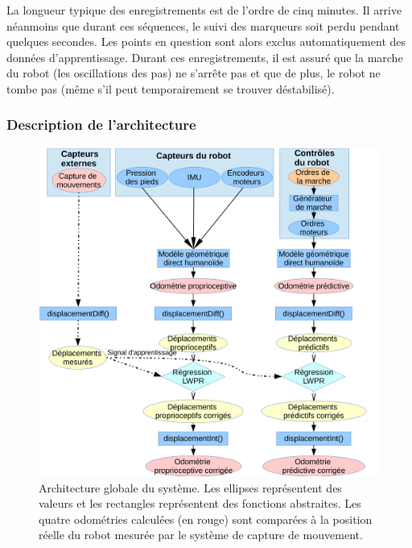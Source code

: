 La longueur typique des enregistrements est de l'ordre de cinq minutes.
Il arrive néanmoins que durant ces séquences, le suivi des marqueurs soit perdu
pendant quelques secondes. 
Les points en question sont alors exclus automatiquement des données d'apprentissage.
Durant ces enregistrements, il est assuré que la marche du robot (les oscillations des pas)
ne s'arrête pas et que de plus, le robot ne tombe pas (même s'il peut temporairement
se trouver déstabilisé).

\subsubsection{Description de l'architecture}

\begin{figure}[htb]
    \begin{center}
        \includegraphics[type=pdf,ext=.pdf,read=.pdf,width=1.0\linewidth]{../schema/architecture}
        \caption{\label{fig:architecture_lwpr} 
            Architecture globale du système.
            Les ellipses représentent des valeurs et les
            rectangles représentent des fonctions abstraites.
            Les quatre odométries calculées (en rouge) sont comparées
            à la position réelle du robot mesurée par le système 
            de capture de mouvement.
        }
    \end{center}
\end{figure}


